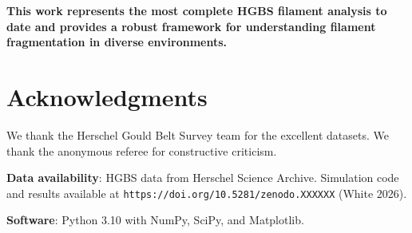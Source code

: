 \documentclass[11pt,a4paper]{article}
\begin{document}
\textbf{This work represents the most complete HGBS filament analysis to date and provides a robust framework for understanding filament fragmentation in diverse environments.}

\section*{Acknowledgments}

We thank the Herschel Gould Belt Survey team for the excellent datasets. We thank the anonymous referee for constructive criticism.

\textbf{Data availability}: HGBS data from Herschel Science Archive. Simulation code and results available at \texttt{https://doi.org/10.5281/zenodo.XXXXXX} (White 2026).

\textbf{Software}: Python 3.10 with NumPy, SciPy, and Matplotlib.



\end{document}
